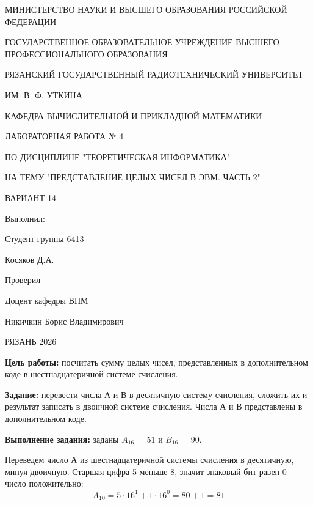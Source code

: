 \documentclass[a4paper, 12pt]{article}
\begin{document}
\begin{center}
    МИНИСТЕРСТВО НАУКИ И ВЫСШЕГО ОБРАЗОВАНИЯ РОССИЙСКОЙ ФЕДЕРАЦИИ

    ГОСУДАРСТВЕННОЕ ОБРАЗОВАТЕЛЬНОЕ УЧРЕЖДЕНИЕ ВЫСШЕГО ПРОФЕССИОНАЛЬНОГО ОБРАЗОВАНИЯ

    РЯЗАНСКИЙ ГОСУДАРСТВЕННЫЙ РАДИОТЕХНИЧЕСКИЙ УНИВЕРСИТЕТ

    ИМ. В. Ф. УТКИНА

    КАФЕДРА ВЫЧИСЛИТЕЛЬНОЙ И ПРИКЛАДНОЙ МАТЕМАТИКИ
\end{center}

\vspace{5 cm}

\begin{center}
    ЛАБОРАТОРНАЯ РАБОТА № 4

    ПО ДИСЦИПЛИНЕ "ТЕОРЕТИЧЕСКАЯ ИНФОРМАТИКА"

    НА ТЕМУ "ПРЕДСТАВЛЕНИЕ ЦЕЛЫХ ЧИСЕЛ В ЭВМ. ЧАСТЬ 2"

    ВАРИАНТ 14

\end{center}

\vspace{7 cm}

\begin{flushright}
    Выполнил:

    Студент группы 6413

    Косяков Д.А.

    Проверил

    Доцент кафедры ВПМ

    Никичкин Борис Владимирович
\end{flushright}

\begin{center}
    РЯЗАНЬ 2026
\end{center}

\pagebreak

\textbf{ Цель работы:} посчитать сумму целых чисел, представленных в дополнительном коде в шестнадцатеричной системе счисления.

\textbf{ Задание:} перевести числа А и В в десятичную систему счисления,
сложить их и результат записать в двоичной системе счисления.
Числа А и В представлены в дополнительном коде.

\textbf{ Выполнение задания:} заданы $A_{16}$ = 51 и $B_{16}$ = 90.

Переведем число А из шестнадцатеричной системы счисления в десятичную, минуя двоичную.
Старшая цифра 5 меньше 8, значит знаковый бит равен 0 --- число положительно:
$$A_{10} = 5 \cdot 16^1 + 1 \cdot 16^0 = 80 + 1 = 81$$
\end{document}
